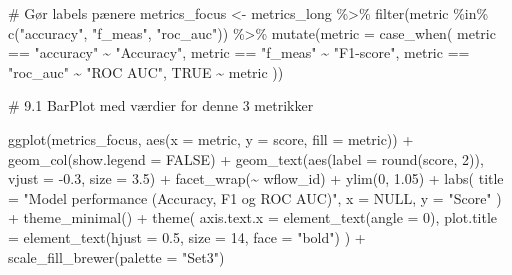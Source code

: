 \documentclass[
  11pt,
  letterpaper,
  DIV=11,
  numbers=noendperiod]{scrartcl}
\newenvironment{Shaded}{\begin{snugshade}}{\end{snugshade}}
\newcommand{\AttributeTok}[1]{\textcolor[rgb]{0.40,0.45,0.13}{#1}}
\newcommand{\CommentTok}[1]{\textcolor[rgb]{0.37,0.37,0.37}{#1}}
\newcommand{\ConstantTok}[1]{\textcolor[rgb]{0.56,0.35,0.01}{#1}}
\newcommand{\DecValTok}[1]{\textcolor[rgb]{0.68,0.00,0.00}{#1}}
\newcommand{\FloatTok}[1]{\textcolor[rgb]{0.68,0.00,0.00}{#1}}
\newcommand{\FunctionTok}[1]{\textcolor[rgb]{0.28,0.35,0.67}{#1}}
\newcommand{\NormalTok}[1]{\textcolor[rgb]{0.00,0.23,0.31}{#1}}
\newcommand{\OtherTok}[1]{\textcolor[rgb]{0.00,0.23,0.31}{#1}}
\newcommand{\SpecialCharTok}[1]{\textcolor[rgb]{0.37,0.37,0.37}{#1}}
\newcommand{\StringTok}[1]{\textcolor[rgb]{0.13,0.47,0.30}{#1}}
\begin{document}
\begin{Shaded}
\begin{Highlighting}[]
\CommentTok{\# Gør labels pænere}
\NormalTok{metrics\_focus }\OtherTok{\textless{}{-}}\NormalTok{ metrics\_long }\SpecialCharTok{\%\textgreater{}\%}
  \FunctionTok{filter}\NormalTok{(metric }\SpecialCharTok{\%in\%} \FunctionTok{c}\NormalTok{(}\StringTok{"accuracy"}\NormalTok{, }\StringTok{"f\_meas"}\NormalTok{, }\StringTok{"roc\_auc"}\NormalTok{)) }\SpecialCharTok{\%\textgreater{}\%}
  \FunctionTok{mutate}\NormalTok{(}\AttributeTok{metric =} \FunctionTok{case\_when}\NormalTok{(}
\NormalTok{    metric }\SpecialCharTok{==} \StringTok{"accuracy"} \SpecialCharTok{\textasciitilde{}} \StringTok{"Accuracy"}\NormalTok{,}
\NormalTok{    metric }\SpecialCharTok{==} \StringTok{"f\_meas"} \SpecialCharTok{\textasciitilde{}} \StringTok{"F1{-}score"}\NormalTok{,}
\NormalTok{    metric }\SpecialCharTok{==} \StringTok{"roc\_auc"} \SpecialCharTok{\textasciitilde{}} \StringTok{"ROC AUC"}\NormalTok{,}
    \ConstantTok{TRUE} \SpecialCharTok{\textasciitilde{}}\NormalTok{ metric}
\NormalTok{  ))}

\CommentTok{\# 9.1 BarPlot med værdier for denne 3 metrikker}

\FunctionTok{ggplot}\NormalTok{(metrics\_focus, }\FunctionTok{aes}\NormalTok{(}\AttributeTok{x =}\NormalTok{ metric, }\AttributeTok{y =}\NormalTok{ score, }\AttributeTok{fill =}\NormalTok{ metric)) }\SpecialCharTok{+}
  \FunctionTok{geom\_col}\NormalTok{(}\AttributeTok{show.legend =} \ConstantTok{FALSE}\NormalTok{) }\SpecialCharTok{+}
  \FunctionTok{geom\_text}\NormalTok{(}\FunctionTok{aes}\NormalTok{(}\AttributeTok{label =} \FunctionTok{round}\NormalTok{(score, }\DecValTok{2}\NormalTok{)), }\AttributeTok{vjust =} \SpecialCharTok{{-}}\FloatTok{0.3}\NormalTok{, }\AttributeTok{size =} \FloatTok{3.5}\NormalTok{) }\SpecialCharTok{+}
  \FunctionTok{facet\_wrap}\NormalTok{(}\SpecialCharTok{\textasciitilde{}}\NormalTok{ wflow\_id) }\SpecialCharTok{+}
  \FunctionTok{ylim}\NormalTok{(}\DecValTok{0}\NormalTok{, }\FloatTok{1.05}\NormalTok{) }\SpecialCharTok{+}
  \FunctionTok{labs}\NormalTok{(}
    \AttributeTok{title =} \StringTok{"Model performance (Accuracy, F1 og ROC AUC)"}\NormalTok{,}
    \AttributeTok{x =} \ConstantTok{NULL}\NormalTok{,}
    \AttributeTok{y =} \StringTok{"Score"}
\NormalTok{  ) }\SpecialCharTok{+}
  \FunctionTok{theme\_minimal}\NormalTok{() }\SpecialCharTok{+}
  \FunctionTok{theme}\NormalTok{(}
    \AttributeTok{axis.text.x =} \FunctionTok{element\_text}\NormalTok{(}\AttributeTok{angle =} \DecValTok{0}\NormalTok{),}
    \AttributeTok{plot.title =} \FunctionTok{element\_text}\NormalTok{(}\AttributeTok{hjust =} \FloatTok{0.5}\NormalTok{, }\AttributeTok{size =} \DecValTok{14}\NormalTok{, }\AttributeTok{face =} \StringTok{"bold"}\NormalTok{)}
\NormalTok{  ) }\SpecialCharTok{+}
  \FunctionTok{scale\_fill\_brewer}\NormalTok{(}\AttributeTok{palette =} \StringTok{"Set3"}\NormalTok{)}
\end{Highlighting}
\end{Shaded}
\end{document}
